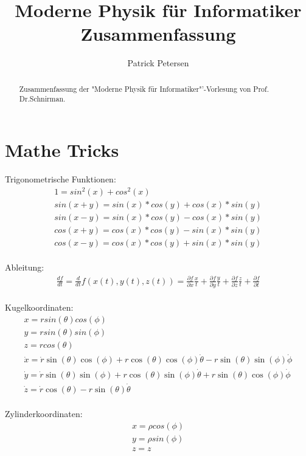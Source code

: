 \documentclass[10pt,a4paper]{article}
\author{Patrick Petersen}
\title{Moderne Physik für Informatiker Zusammenfassung}
\begin{document}
\maketitle

\begin{abstract}
Zusammenfassung der "Moderne Physik für Informatiker"'-Vorlesung von Prof. Dr.Schnirman.
\end{abstract}

\setcounter{tocdepth}{3}


\newpage
\tableofcontents


\newpage

\section{Mathe Tricks}

Trigonometrische Funktionen:
\begin{eqnarray}
1=sin^2(x)+cos^2(x)\\
sin(x+y) = sin(x)*cos(y) + cos(x)*sin(y)\\
sin(x-y) = sin(x)*cos(y) - cos(x)*sin(y)\\
cos(x+y) = cos(x)*cos(y) - sin(x)*sin(y)\\
cos(x-y) = cos(x)*cos(y) + sin(x)*sin(y)
\end{eqnarray}
%
\\
Ableitung:
\begin{eqnarray}
\frac{df}{dt} = \frac{d}{dt} f(x(t),y(t),z(t))=  \frac{\partial f}{\partial x} \frac{x}{t} + \frac{\partial f}{\partial y} \frac{y}{t} + \frac{\partial f}{\partial z} \frac{z}{t} + \frac{\partial f}{\partial t}
\end{eqnarray}
%
\\
Kugelkoordinaten:
\begin{eqnarray}
x = r sin(\theta)cos(\phi)\\
y = r sin(\theta)sin(\phi)\\
z = r cos(\theta)\\
\dot{x} =\dot{r}\sin(\theta)\cos(\phi)+r\cos(\theta)\cos(\phi)\dot{\theta }-r\sin(\theta)\sin(\phi)\dot{\phi}\\
\dot{y} = \dot{r}\sin(\theta)\sin(\phi)+r\cos(\theta)\sin(\phi)\dot{\theta }+r\sin(\theta)\cos(\phi)\dot{\phi}\\
\dot{z}= \dot{r}\cos(\theta)-r\sin(\theta)\dot{\theta}
\end{eqnarray}
%
\\
Zylinderkoordinaten:
\begin{eqnarray}
x = \rho cos(\phi)\\
y = \rho sin(\phi)\\
z = z
\end{eqnarray}
\end{document}

